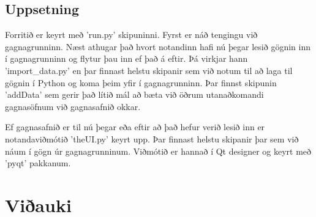 \documentclass[11pt,a4paper]{amsart}
\theoremstyle{plain}
\theoremstyle{definition}
\theoremstyle{remark}
\begin{document}
\subsection{Uppsetning}
Forritið er keyrt með 'run.py' skipuninni. Fyrst er náð tengingu við gagnagrunninn. Næst athugar það hvort notandinn hafi nú þegar lesið gögnin inn í gagnagrunninn og flytur þau inn ef það á eftir. Þá virkjar hann 'import\_data.py' en þar finnast helstu skipanir sem við notum til að laga til gögnin í Python og koma þeim yfir í gagnagrunninn. Þar finnst skipunin 'addData' sem gerir það lítið mál að bæta við öðrum utanaðkomandi gagnasöfnum við gagnasafnið okkar.\\\par
Ef gagnasafnið er til nú þegar eða eftir að það hefur verið lesið inn er notandaviðmótið 'theUI.py' keyrt upp. Þar finnast helstu skipanir þar sem við náum í gögn úr gagnagrunninum. Viðmótið er hannað í Qt designer og keyrt með 'pyqt' pakkanum.

\newpage

\section{Viðauki}
\end{document}
